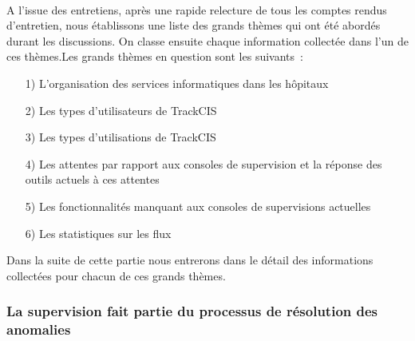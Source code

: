 			\paragraph{}%
			A l'issue des entretiens, après une rapide relecture de tous les comptes
			rendus d'entretien, nous établissons une liste des grands thèmes qui ont été
			abordés durant les discussions.
			On classe ensuite chaque information collectée dans l'un de ces
			thèmes.\newline Les grands thèmes en question sont les suivants~:
			\begin{itemize}
			  \item[1)] L’organisation des services informatiques dans les
			  hôpitaux
			  \item[2)] Les types d’utilisateurs de TrackCIS
			  \item[3)] Les types d’utilisations de TrackCIS
			  \item[4)] Les attentes par rapport aux consoles de supervision
			  et la réponse des outils actuels à ces attentes
			  \item[5)] Les fonctionnalités manquant aux consoles de
			  supervisions actuelles
			  \item[6)] Les statistiques sur les flux
			\end{itemize}
			Dans la suite de cette partie nous entrerons dans le détail des informations
			collectées pour chacun de ces grands thèmes.
			
		\subsubsection{La supervision fait partie du processus de résolution des
		anomalies}
